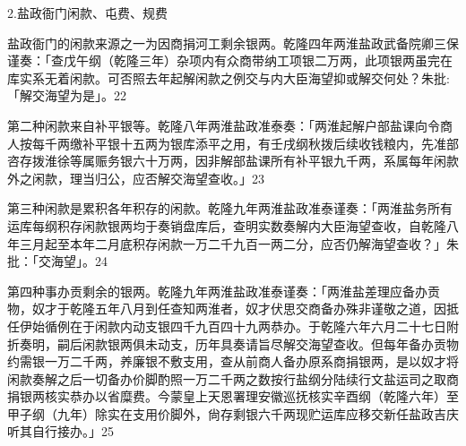 \begin{BookNotes}
\end{BookNotes}





2.盐政衙门闲款、屯费、规费

盐政衙门的闲款来源之一为因商捐河工剩余银两。乾隆四年两淮盐政武备院卿三保谨奏：「查戊午纲（乾隆三年）杂项内有众商带纳工项银二万两，此项银两虽完在库实系无着闲款。可否照去年起解闲款之例交与内大臣海望抑或解交何处？朱批:「解交海望为是」。22

第二种闲款来自补平银等。乾隆八年两淮盐政准泰奏：「两淮起解户部盐课向令商人按每千两缴补平银十五两为银库添平之用，有壬戌纲秋拨后续收钱粮内，先准部咨存拨淮徐等属赈务银六十万两，因非解部盐课所有补平银九千两，系属每年闲款外之闲款，理当归公，应否解交海望查收。」23

第三种闲款是累积各年积存的闲款。乾隆九年两淮盐政准泰谨奏：「两淮盐务所有运库每纲积存闲款银两均于奏销盘库后，查明实数奏解内大臣海望查收，自乾隆八年三月起至本年二月底积存闲款一万二千九百一两二分，应否仍解海望查收？」朱批：「交海望」。24

第四种事办贡剩余的银两。乾隆九年两淮盐政准泰谨奏：「两淮盐差理应备办贡物，奴才于乾隆五年八月到任查知两淮者，奴才伏思交商备办殊非谨敬之道，因抵任伊始循例在于闲款内动支银四千九百四十九两恭办。于乾隆六年六月二十七日附折奏明，嗣后闲款银两俱未动支，历年具奏请旨尽解交海望查收。但每年备办贡物约需银一万二千两，养廉银不敷支用，查从前商人备办原系商捐银两，是以奴才将闲款奏解之后一切备办价脚酌照一万二千两之数按行盐纲分陆续行文盐运司之取商捐银两核实恭办以省糜费。今蒙皇上天恩署理安徽巡抚核实辛酉纲（乾隆六年）至甲子纲（九年）除实在支用价脚外，尙存剩银六千两现贮运库应移交新任盐政吉庆听其自行接办。」25

